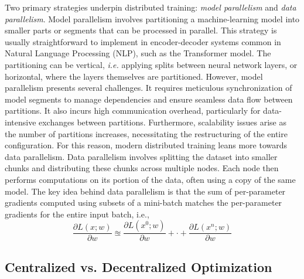 \documentclass[11pt]{article}
\begin{document}
Two primary strategies underpin distributed training: \textit{model parallelism} and \textit{data parallelism}. Model parallelism involves partitioning a machine-learning model into smaller parts or segments that can be processed in parallel. This strategy is usually straightforward to implement in encoder-decoder systems common in Natural Language Processing (NLP), such as the Transformer model. The partitioning can be vertical, \textit{i.e.} applying splits between neural network layers, or horizontal, where the layers themselves are partitioned.
However, model parallelism presents several challenges. It requires meticulous synchronization of model segments to manage dependencies and ensure seamless data flow between partitions. It also incurs high communication overhead, particularly for data-intensive exchanges between partitions. Furthermore, scalability issues arise as the number of partitions increases, necessitating the restructuring of the entire configuration. For this reason, modern distributed training leans more towards data parallelism.
Data parallelism involves splitting the dataset into smaller chunks and distributing these chunks across multiple nodes. Each node then performs computations on its portion of the data, often using a copy of the same model. The key idea behind data parallelism is that the sum of per-parameter gradients computed using subsets of a mini-batch matches the per-parameter gradients for the entire input batch, i.e., \[ \frac{\partial L(x;w)}{\partial w} \approxeq \frac{\partial L(x^0;w)}{\partial w} + \cdot + \frac{\partial L(x^n;w)}{\partial w} \]


\subsection*{Centralized vs. Decentralized Optimization}
\end{document}
